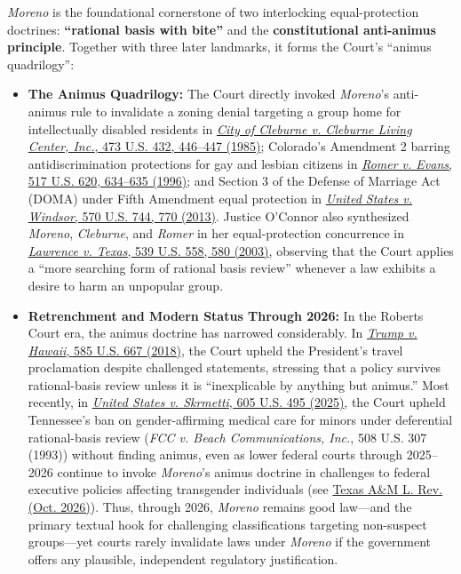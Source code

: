 \documentclass[12pt]{article}
\begin{document}
\textit{Moreno} is the foundational cornerstone of two interlocking equal-protection doctrines: \textbf{``rational basis with bite''} and the \textbf{constitutional anti-animus principle}. Together with three later landmarks, it forms the Court's ``animus quadrilogy'':
\begin{itemize}
  \item \textbf{The Animus Quadrilogy:} The Court directly invoked \textit{Moreno}'s anti-animus rule to invalidate a zoning denial targeting a group home for intellectually disabled residents in \href{https://supreme.justia.com/cases/federal/us/473/432/}{\textit{City of Cleburne v. Cleburne Living Center, Inc.}, 473 U.S. 432, 446--447 (1985)}; Colorado's Amendment 2 barring antidiscrimination protections for gay and lesbian citizens in \href{https://supreme.justia.com/cases/federal/us/517/620/}{\textit{Romer v. Evans}, 517 U.S. 620, 634--635 (1996)}; and Section 3 of the Defense of Marriage Act (DOMA) under Fifth Amendment equal protection in \href{https://supreme.justia.com/cases/federal/us/570/744/}{\textit{United States v. Windsor}, 570 U.S. 744, 770 (2013)}. Justice O'Connor also synthesized \textit{Moreno}, \textit{Cleburne}, and \textit{Romer} in her equal-protection concurrence in \href{https://supreme.justia.com/cases/federal/us/539/558/}{\textit{Lawrence v. Texas}, 539 U.S. 558, 580 (2003)}, observing that the Court applies a ``more searching form of rational basis review'' whenever a law exhibits a desire to harm an unpopular group.
  \item \textbf{Retrenchment and Modern Status Through 2026:} In the Roberts Court era, the animus doctrine has narrowed considerably. In \href{https://supreme.justia.com/cases/federal/us/585/17-965/}{\textit{Trump v. Hawaii}, 585 U.S. 667 (2018)}, the Court upheld the President's travel proclamation despite challenged statements, stressing that a policy survives rational-basis review unless it is ``inexplicable by anything but animus.'' Most recently, in \href{https://www.supremecourt.gov/opinions/24pdf/23-477_2cp3.pdf}{\textit{United States v. Skrmetti}, 605 U.S. 495 (2025)}, the Court upheld Tennessee's ban on gender-affirming medical care for minors under deferential rational-basis review (\textit{FCC v. Beach Communications, Inc.}, 508 U.S. 307 (1993)) without finding animus, even as lower federal courts through 2025--2026 continue to invoke \textit{Moreno}'s animus doctrine in challenges to federal executive policies affecting transgender individuals (see \href{https://scholarship.law.tamu.edu/cgi/viewcontent.cgi?article=1438&context=lawreview}{Texas A\&M L. Rev. (Oct. 2026)}). Thus, through 2026, \textit{Moreno} remains good law---and the primary textual hook for challenging classifications targeting non-suspect groups---yet courts rarely invalidate laws under \textit{Moreno} if the government offers any plausible, independent regulatory justification.
\end{itemize}
\end{document}
